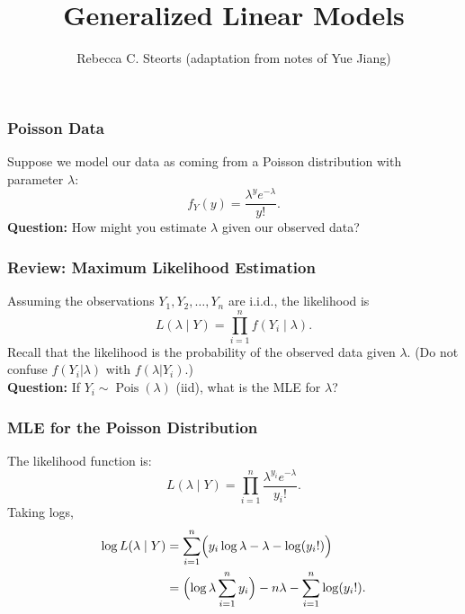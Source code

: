 \documentclass{beamer}
\title{Generalized Linear Models}
\author{Rebecca C. Steorts (adaptation from notes of Yue Jiang)}
\begin{document}
\begin{frame}
  \titlepage
\end{frame}

\begin{frame}
\frametitle{Poisson Data}
 Suppose we model our data as coming from a Poisson distribution with parameter $\lambda$:
  \[
  f_Y(y) = \frac{\lambda^y e^{-\lambda}}{y!}.
  \]
 \textbf{Question:} How might you estimate $\lambda$ given our observed data?
\end{frame}

\begin{frame}
\frametitle{Review: Maximum Likelihood Estimation}
Assuming the observations $Y_1, Y_2, \dots, Y_n$ are i.i.d., the likelihood is
\[
L(\lambda \mid Y) = \prod_{i=1}^n f(Y_i \mid \lambda).
\]
Recall that the likelihood is the probability of the observed data given $\lambda$. (Do not confuse $f(Y_i|\lambda)$ with $f(\lambda|Y_i)$.)\\[1em]
\textbf{Question:} If $Y_i \sim \operatorname{Pois}(\lambda)$ (iid), what is the MLE for $\lambda$?
\end{frame}

\begin{frame}
\frametitle{MLE for the Poisson Distribution}
The likelihood function is:
\[
L(\lambda \mid Y) = \prod_{i=1}^n \frac{\lambda^{y_i} e^{-\lambda}}{y_i!}.
\]
Taking logs,
\begin{align}
\log L(\lambda \mid Y) 
&= \sum_{i=1}^n \Bigl( y_i \log \lambda - \lambda - \log (y_i!) \Bigr) \\
&= \Bigl(\log \lambda \sum_{i=1}^n y_i\Bigr) - n\lambda - \sum_{i=1}^n \log(y_i!).
\end{align}
\end{frame}
\end{document}
